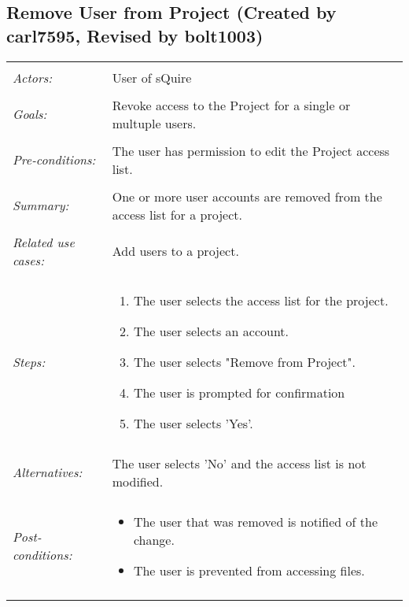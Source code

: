 \documentclass[11pt]{report}
\begin{document}
\subsection{Remove User from Project (Created by carl7595, Revised by bolt1003)}
\begin{tabular}{ p{2cm} p{12cm} }   
 \hline
 \\
 \textit{Actors:} & User of sQuire \\
 \\
 \textit{Goals:} & Revoke access to the Project for a single or multuple users. \\
 \\
 \textit{Pre-conditions:} & The user has permission to edit the Project access list. \\
 \\
 \textit{Summary:} & One or more user accounts are removed from the access list for a project. \\ 
 \\
 \textit{Related use cases:} & Add users to a project.  \\ 
 \\
 \textit{Steps:} & \begin{enumerate}
  \item The user selects the access list for the project.
	 \item The user selects an account. 
	 \item The user selects "Remove from Project".
	 \item The user is prompted for confirmation
	 \item The user selects 'Yes'.
 \end{enumerate} \\
 \\
 \textit{Alternatives:} & The user selects 'No' and the access list is not modified. \\
 \\
 \textit{Post-conditions:} & \begin{itemize}
	 \item The user that was removed is notified of the change.
	 \item The user is prevented from accessing files.
 \end{itemize}\\
 \\
\hline
\end{tabular}
\end{document}
